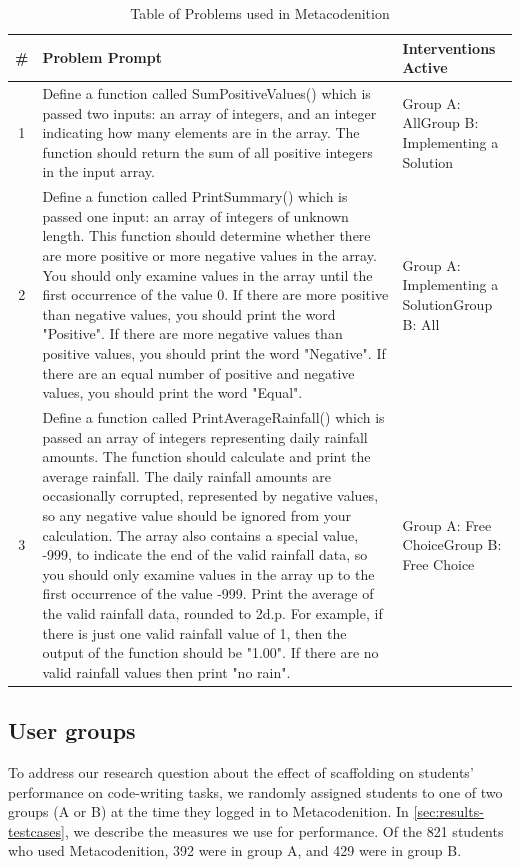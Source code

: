 \documentclass[sigconf,anonymous]{acmart}
\begin{document}
\begin{table}
  \caption{Table of Problems used in Metacodenition}
  \label{tab:problems}
  \begin{tabular}{c p{37em} p{14em}}
    \toprule
    \# & Problem Prompt & Interventions Active\\
    \midrule
    1 &Define a function called SumPositiveValues() which is passed two inputs: an array of integers, and an integer indicating how many elements are in the array. The function should return the sum of all positive integers in the input array.& Group A: All\newline Group B: Implementing a Solution\\
    \midrule
    2 &Define a function called PrintSummary() which is passed one input: an array of integers of unknown length. This function should determine whether there are more positive or more negative values in the array. You should only examine values in the array until the first occurrence of the value 0. If there are more positive than negative values, you should print the word "Positive". If there are more negative values than positive values, you should print the word "Negative". If there are an equal number of positive and negative values, you should print the word "Equal".& Group A: Implementing a Solution\newline Group B: All\\
    \midrule
    3 &Define a function called PrintAverageRainfall() which is passed an array of integers representing daily rainfall amounts. The function should calculate and print the average rainfall. The daily rainfall amounts are occasionally corrupted, represented by negative values, so any negative value should be ignored from your calculation. The array also contains a special value, -999, to indicate the end of the valid rainfall data, so you should only examine values in the array up to the first occurrence of the value -999. Print the average of the valid rainfall data, rounded to 2d.p. For example, if there is just one valid rainfall value of 1, then the output of the function should be "1.00". If there are no valid rainfall values then print "no rain". & Group A: Free Choice\newline Group B: Free Choice\\
  \bottomrule
\end{tabular}
\end{table}

\subsection{User groups} \label{sec:evaluation-usergroups}
To address our research question about the effect of scaffolding on students' performance on code-writing tasks, we 
randomly assigned students to one of two groups (A or B) at the time they logged in to 
Metacodenition. In \autoref{sec:results-testcases}, we describe the measures we use for performance. Of the 821 students who used Metacodenition, 392 were in group A, and 429 were in group B.
\end{document}
